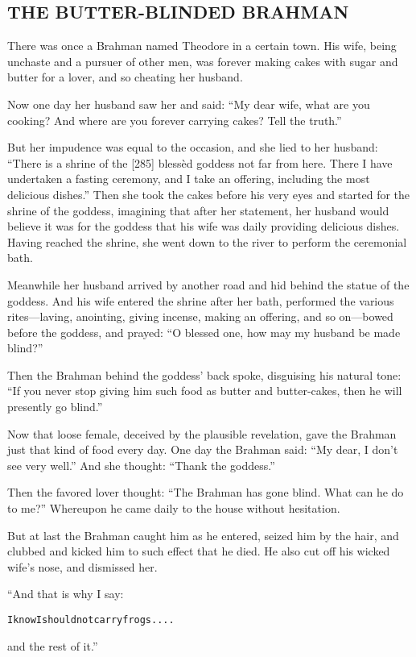 \documentclass{article}
\renewenvironment{verbatim}{\begin{alltt}\normalfont\begin{centering}}{\end{centering}\end{alltt}}
\begin{document}
\subsection{THE BUTTER-BLINDED BRAHMAN}

There was once a Brahman named Theodore in a certain town. His
wife, being unchaste and a pursuer of other men, was forever making
cakes with sugar and butter for a lover, and so cheating her
husband.

Now one day her husband saw her and said:
``My dear wife, what are you cooking? And where are you forever carrying cakes? Tell the truth.''

But her impudence was equal to the occasion, and she lied to her
husband:
``There is a shrine of the [285] blessèd goddess not far from here. There I have undertaken a fasting ceremony, and I take an offering, including the most delicious dishes.''
Then she took the cakes before his very eyes and started for the
shrine of the goddess, imagining that after her statement, her
husband would believe it was for the goddess that his wife was
daily providing delicious dishes. Having reached the shrine, she
went down to the river to perform the ceremonial bath.

Meanwhile her husband arrived by another road and hid behind the
statue of the goddess. And his wife entered the shrine after her
bath, performed the various rites---laving, anointing, giving
incense, making an offering, and so on---bowed before the goddess,
and prayed: ``O blessed one, how may my husband be made blind?''

Then the Brahman behind the goddess' back spoke, disguising his
natural tone:
``If you never stop giving him such food as butter and butter-cakes, then he will presently go blind.''

Now that loose female, deceived by the plausible revelation, gave
the Brahman just that kind of food every day. One day the Brahman
said: ``My dear, I don't see very well.'' And she thought:
``Thank the goddess.''

Then the favored lover thought:
``The Brahman has gone blind. What can he do to me?'' Whereupon he
came daily to the house without hesitation.

But at last the Brahman caught him as he entered, seized him by the
hair, and clubbed and kicked him to such effect that he died. He
also cut off his wicked wife's nose, and dismissed her.

“And that is why I say:

\begin{verbatim}
I know I should not carry frogs ....
\end{verbatim}
and the rest of it.”
\end{document}
